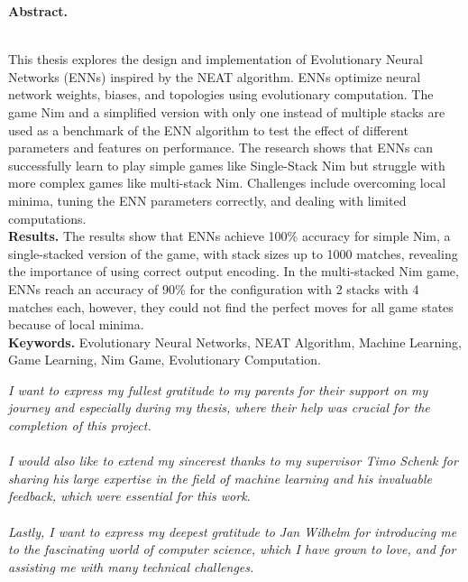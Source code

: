 \documentclass[12pt]{report}
\begin{document}
    \begin{doublespace}
        \begin{center}
            \textbf{Abstract.}
        \end{center}
        \\
        This thesis explores the design and implementation of Evolutionary Neural Networks (ENNs) inspired by the NEAT algorithm.
        ENNs optimize neural network weights, biases, and topologies using evolutionary computation.
        The game Nim and a simplified version with only one instead of multiple stacks are used as a benchmark of the ENN algorithm to test the effect of different parameters and features on performance.
        The research shows that ENNs can successfully learn to play simple games like Single-Stack Nim but struggle with more complex games like multi-stack Nim.
        Challenges include overcoming local minima, tuning the ENN parameters correctly, and dealing with limited computations.
        \\
        \textbf{Results.}
        The results show that ENNs achieve 100\% accuracy for simple Nim, a single-stacked version of the game, with stack sizes up to 1000 matches, revealing the importance of using correct output encoding.
        In the multi-stacked Nim game, ENNs reach an accuracy of 90\% for the configuration with 2 stacks with 4 matches each, however, they could not find the perfect moves for all game states because of local minima.
        \\
        \textbf{Keywords.}
        Evolutionary Neural Networks, NEAT Algorithm, Machine Learning, Game Learning, Nim Game, Evolutionary Computation.

        \newpage
        \vspace*{5em}
        \begin{adjustwidth}{2cm}{2cm}
            \textit{
                I want to express my fullest gratitude to my parents for their support on my journey and especially during my thesis, where their help was crucial for the completion of this project.
                \\ \\
                I would also like to extend my sincerest thanks to my supervisor Timo Schenk for sharing his large expertise in the field of machine learning and his invaluable feedback, which were essential for this work.
                \\ \\
                Lastly, I want to express my deepest gratitude to Jan Wilhelm for introducing me to the fascinating world of computer science, which I have grown to love, and for assisting me with many technical challenges.
            }
        \end{adjustwidth}
    \end{doublespace}
    \newpage
\end{document}
